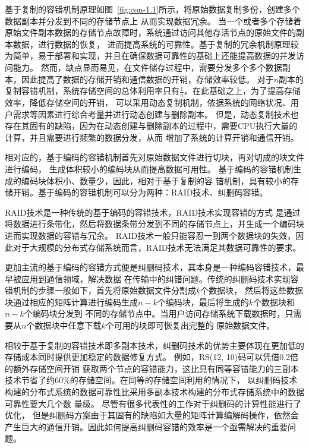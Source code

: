 基于复制的容错机制原理如图~\ref{fig:con-1.1}所示，将原始数据复制多份，创建多个数据副本并分发到不同的存储节点上
从而实现数据冗余\cite{shvachko2010hadoop,ghemawat2003google,王意洁2017分布式存储中的纠删码容错技术研究}。
当一个或者多个存储着原始文件副本数据的存储节点故障时，系统通过访问其他存活节点的原始文件的副本数据，进行数据的恢复，
进而提高系统的可靠性。基于复制的冗余机制原理较为简单，易于部署和实现，并且在确保数据可靠性的基础上还能提高数据的并发访问能力。
然而，缺点显而易见，在文件储存过程中，需要分发多个多个数据副本，因此提高了数据的存储开销和通信数据的开销，存储效率较低。
对于$n$副本的复制容错机制，系统存储空间的总体利用率只有$\frac{1}{n}$。在此基础之上，为了提高存储效率，降低存储空间的开销，
可以采用动态复制机制，依据系统的网络状况、用户需求等因素进行综合考量并进行动态创建与删除副本\cite{lakshman2010cassandra,gill2016dynamic,gai2012design}。
但是，动态复制技术也存在其固有的缺陷，因为在动态创建与删除副本的过程中，需要CPU执行大量的计算，并且需要进行频繁的数据分发，从而
增加了系统的计算开销和通信开销。


相对应的，基于编码的容错机制首先对原始数据文件进行切块，再对切成的块文件进行编码，
生成体积较小的编码块从而提高数据可用性。
基于编码的容错机制生成的编码块体积小、数量少，因此，相对于基于复制的容
错机制，具有较小的存储开销。基于编码的容错机制可以分为两种：RAID技术、纠删码容错。

RAID技术\cite{patterson1988case,chen1994raid}是一种传统的基于编码的容错技术，RAID技术实现容错的方式
是通过将数据进行条带化，然后将数据条带分发到不同的存储节点上，并生成一个编码块进而实现数据的容错与冗余。
RAID技术一般只能容忍一到两个数据块的失效，因此对于大规模的分布式存储系统而言，RAID技术无法满足其数据可靠性的要求。

更加主流的基于编码的容错方式便是纠删码技术，其本身是一种编码容错技术，最早被应用到通信领域，解决数据
在传输中的纠错问题。传统的纠删码技术实现容错机制的步骤一般如下，首先将原始数据文件分割成$k$个数据块，
然后将这些数据块通过相应的矩阵计算进行编码生成$n-k$个编码块，最后将生成的$k$个数据块和$n-k$个编码块分发到
不同的存储节点中。当用户访问存储系统下载数据时，只需要从$n$个数据块中任意下载$k$个可用的块即可恢复出完整的
原始数据文件。

相较于基于复制的容错技术即多副本技术，纠删码技术的优势主要体现在更加低的存储成本同时提供更加稳定的数据修复方式\cite{lin2004erasure,weatherspoon2002erasure}。
例如，RS(12, 10)码可以凭借0.2倍的额外存储空间开销
获取两个节点的容错能力，这比具有同等容错能力的三副本技术节省了约60\%的存储空间。在同等的存储空间利用的情况下，
以纠删码技术构建的分布式系统的数据可靠性比采用多副本技术构建的分布式存储系统中的数据可靠性要大几个数
量级\cite{lin2004erasure,weatherspoon2002erasure}。
尽管有很多代表性的工作\citep{huang2019lower,xu1999x,reed1960polynomial,roth1989mds}对于纠删码的计算性能进行了优化，
但是纠删码方案由于其固有的缺陷如大量的矩阵计算编解码操作，依然会产生巨大的通信开销。因此如何提高纠删码容错的效率是一个亟需解决的重要问题。

